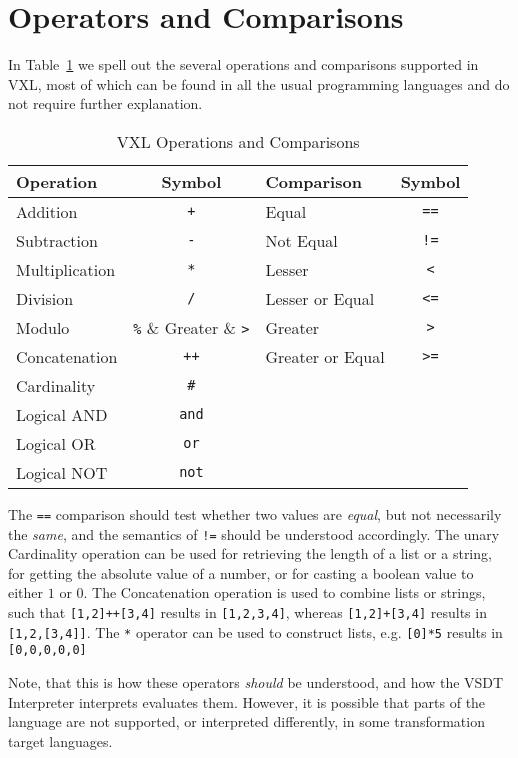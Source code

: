 
\section{Operators and Comparisons}

In Table~\ref{tab:vxl_op} we spell out the several operations and comparisons
supported in VXL, most of which can be found in all the usual programming languages
and do not require further explanation.

\begin{table}[htbp]
\centering
	\caption{VXL Operations and Comparisons}
	\begin{tabular}{lc||lc}
		\textbf{Operation}   & \textbf{Symbol} & \textbf{Comparison} & \textbf{Symbol} \\
		\hline
		Addition             & \verb_+_	       & Equal               & \verb_==_       \\
		Subtraction          & \verb_-_	       & Not Equal           & \verb_!=_       \\
		Multiplication       & \verb_*_        & Lesser              & \verb_<_        \\
		Division             & \verb_/_        & Lesser or Equal     & \verb_<=_       \\
		Modulo               & \verb_%_        & Greater             & \verb_>_        \\
		Concatenation        & \verb_++_       & Greater or Equal    & \verb_>=_       \\
		Cardinality          & \verb_#_        &                     &                 \\
		Logical \textsc{AND} & \verb_and_      &                     &                 \\
		Logical \textsc{OR}  & \verb_or_       &                     &                 \\
		Logical \textsc{NOT} & \verb_not_      &                     &                 \\
	\end{tabular}
	\label{tab:vxl_op}
\end{table}

The \verb_==_ comparison should test whether two values are \emph{equal}, but not
necessarily the \emph{same}, and the semantics of \verb_!=_ should be understood
accordingly.  The unary Cardinality operation can be used for retrieving the length
of a list or a string, for getting the absolute value of a number, or for casting
a boolean value to either $1$ or $0$.  The Concatenation operation is used to
combine lists or strings, such that \verb_[1,2]++[3,4]_ results in \verb_[1,2,3,4]_,
whereas \verb_[1,2]+[3,4]_ results in \verb_[1,2,[3,4]]_.  The \verb_*_ operator
can be used to construct lists, e.g. \verb_[0]*5_ results in \verb_[0,0,0,0,0]_

Note, that this is how these operators \emph{should} be understood, and how the
VSDT Interpreter interprets evaluates them.  However, it is possible that parts
of the language are not supported, or interpreted differently, in some transformation
target languages.

